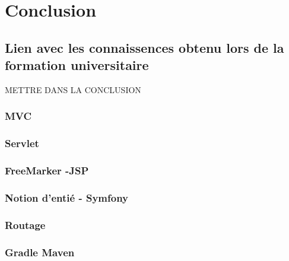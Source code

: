 \chapter{Conclusion}




\section{Lien avec les connaissences obtenu lors de la formation universitaire}
METTRE DANS LA CONCLUSION
\subsection{MVC}
\subsection{Servlet}
\subsection{FreeMarker -JSP}
\subsection{Notion d'entié - Symfony}
\subsection{Routage}
\subsection{Gradle Maven}
